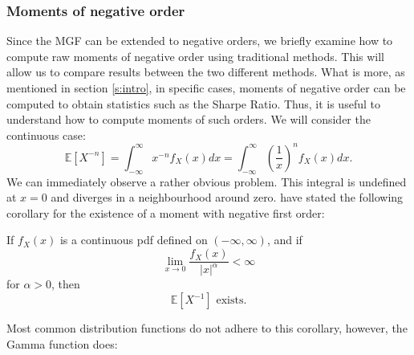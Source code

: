 \subsubsection{Moments of negative order}
Since the MGF can be extended to negative orders, we briefly examine how to compute raw moments of negative order using traditional methods. This will allow us to compare results between the two different methods. What is more, as mentioned in section \ref{s:intro}, in specific cases, moments of negative order can be computed to obtain statistics such as the Sharpe Ratio. Thus, it is useful to understand how to compute moments of such orders. We will consider the continuous case:
\[\mathbb{E}[X^{-n}] = \int_{-\infty}^{\infty} x^{-n} f_X(x) dx = \int_{-\infty}^{\infty} \left(\frac{1}{x}\right)^n f_X(x) dx.\] We can immediately observe a rather obvious problem. This integral is undefined at \(x = 0\) and diverges in a neighbourhood around zero. \cite{khuri2002} have stated the following corollary for the existence of a moment with negative first order:
\begin{corollary}
    If \(f_X(x)\) is a continuous pdf defined on \((-\infty, \infty)\), and if \[\lim_{x \to 0} \frac{f_X(x)}{|x|^\alpha} < \infty\] for \(\alpha > 0\), then \[\mathbb{E}[X^{-1}] \text{ exists}.\]
\end{corollary}

Most common distribution functions do not adhere to this corollary, however, the Gamma function does:

